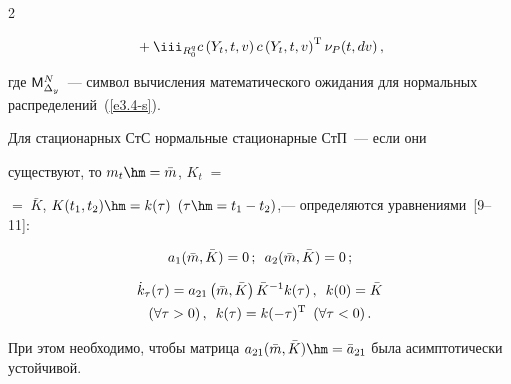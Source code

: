 \begin{multicols}{2}
\begin{itemize}
\begin{multline*}
    {}+\iii_{R_0^q}

    c \left(Y_t, t, v\right) c\left(Y_t, t,v\right)^{\mathrm{T}} \nu_P (t, dv)\,, %

    \end{multline*}

где ${\sf M}_{\Delta_y}^N$~--- символ вычисления математического ожидания для нормальных распределений~(\ref{e3.4-s}).

    \end{itemize}



Для стационарных СтС нормальные стационарные СтП~--- если они

существуют, то  $m_t \hm=\bar m$, $ K_t\;=$\linebreak\vspace*{-12pt}



\columnbreak



\noindent

$=\;\bar K$, $K(t_1, t_2) \hm=

k(\tau)$ $(\tau \hm= t_1-t_2)$,--- определяются уравнениями~[9--11]:

    \begin{equation}

    a_1 (\bar m, \bar K) =0\,;\enskip a_2 (\bar m, \bar K)=0\,;

    \label{e3.9-s}

    \end{equation}



    \vspace*{-14pt}



    \noindent

    \begin{multline}

    \dot k_\tau (\tau) = a_{21} \left(\bar m, \bar K\right)\bar K^{-1} k(\tau)\,,\enskip

    k(0) =\bar K \\

     (\forall \tau >0)\,, \enskip

    k(\tau) = k(-\tau)^{\mathrm{T}} \enskip (\forall\tau <0)\,.\label{e3.10-s}

    \end{multline}

При этом необходимо, чтобы матрица  $a_{21} (\bar m, \bar K)\hm=\bar a_{21}$ была асимптотически устойчивой.




\end{multicols}

